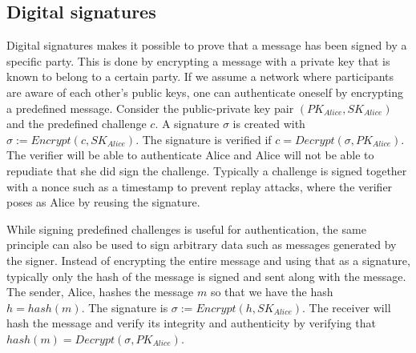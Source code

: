 \subsection{Digital signatures}

Digital signatures makes it possible to prove that a message has been signed by a specific party. This is done by encrypting a message with a private key that is known to belong to a certain party. If we assume a network where participants are aware of each other's public keys, one can authenticate oneself by encrypting a predefined message. Consider the public-private key pair $(PK_{Alice}, SK_{Alice})$ and the predefined challenge $c$. A signature $\sigma$ is created with $\sigma := Encrypt(c, SK_{Alice})$. The signature is verified if $c=Decrypt(\sigma, PK_{Alice})$. The verifier will be able to authenticate Alice and Alice will not be able to repudiate that she did sign the challenge. Typically a challenge is signed together with a nonce such as a timestamp to prevent replay attacks, where the verifier poses as Alice by reusing the signature.

While signing predefined challenges is useful for authentication, the same principle can also be used to sign arbitrary data such as messages generated by the signer. Instead of encrypting the entire message and using that as a signature, typically only the hash of the message is signed and sent along with the message. The sender, Alice, hashes the message $m$ so that we have the hash $h=hash(m)$. The signature is $\sigma := Encrypt(h, SK_{Alice})$. The receiver will hash the message and verify its integrity and authenticity by verifying that $hash(m)=Decrypt(\sigma, PK_{Alice})$.
